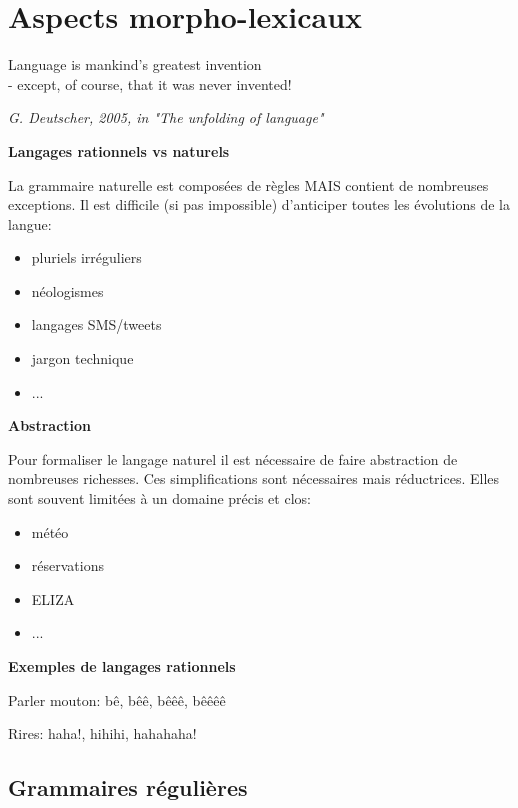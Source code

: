 \vspace{-1.2cm}

\section{Aspects morpho-lexicaux}

\epigraph{Language is mankind's greatest invention \\- except, of course, that it was never invented!}{\textit{G. Deutscher, 2005, in "The unfolding of language"}}

\textbf{Langages rationnels vs naturels}

La grammaire naturelle est composées de règles MAIS contient de nombreuses exceptions. Il est difficile (si pas impossible) d'anticiper toutes les évolutions de la langue:

\begin{itemize}
    \item pluriels irréguliers
    \item néologismes
    \item langages SMS/tweets
    \item jargon technique
    \item ...\\
\end{itemize}

\textbf{Abstraction}

Pour formaliser le langage naturel il est nécessaire de faire abstraction de nombreuses richesses. Ces simplifications sont nécessaires mais réductrices. Elles sont souvent limitées à un domaine précis et clos:

\begin{itemize}
    \item météo
    \item réservations
    \item ELIZA
    \item ...\\
\end{itemize}

\textbf{Exemples de langages rationnels}

Parler mouton: bê, bêê, bêêê, bêêêê

Rires: haha!, hihihi, hahahaha!

\subsection{Grammaires régulières}

